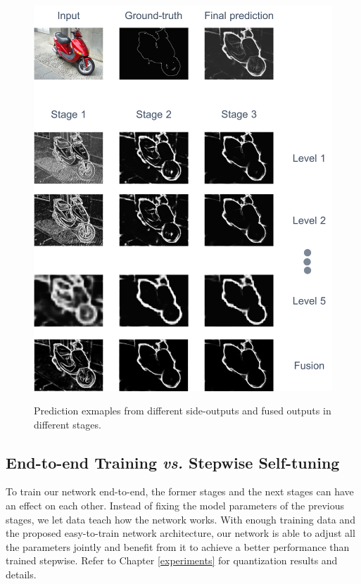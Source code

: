 \documentclass[senior]{IPSstyle}
\begin{document}
\begin{figure}[t]
  \centering
  \includegraphics[width=15cm]{interpretation.png}\\
  \caption{Prediction exmaples from different side-outputs and fused outputs in different stages.}\label{interpretation_png}
\end{figure}

\subsection{End-to-end Training \emph{vs.} Stepwise Self-tuning}
To train our network end-to-end, the former stages and the next stages can have an effect on each other. Instead of fixing the model parameters of the previous stages, we let data teach how the network works. With enough training data and the proposed easy-to-train network architecture, our network is able to adjust all the parameters jointly and benefit from it to achieve a better performance than trained stepwise. Refer to Chapter \ref{experiments} for quantization results and details.
\end{document}
